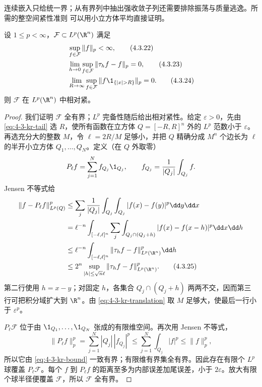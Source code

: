 连续嵌入只给统一界；从有界列中抽出强收敛子列还需要排除振荡与质量逃逸。所需的整空间紧性准则
可以用小立方体平均直接证明。

\begin{lemma}\label{lemma:4-3-3-kolmogorov-riesz}
设 $1\leq p<\infty$，$\mathcal F\subset L^p(\R^n)$ 满足
\begin{align*}
 &\sup_{f\in\mathcal F}\|f\|_p<\infty,\tag{4.3.22}\label{eq:4-3-kr-bound}\\
 &\lim_{h\to0}\sup_{f\in\mathcal F}\|\tau_hf-f\|_p=0,\tag{4.3.23}\label{eq:4-3-kr-translation}\\
 &\lim_{R\to\infty}\sup_{f\in\mathcal F}
   \|f\1_{\{|x|>R\}}\|_p=0.\tag{4.3.24}\label{eq:4-3-kr-tail}
\end{align*}
则 $\mathcal F$ 在 $L^p(\R^n)$ 中相对紧。
\end{lemma}

\begin{proof}
我们证明 $\mathcal F$ 全有界；$L^p$ 完备性随后给出相对紧性。给定 $\varepsilon>0$，先由
\eqref{eq:4-3-kr-tail} 选 $R$，使所有函数在立方体
$Q=[-R,R]^n$ 外的 $L^p$ 范数小于 $\varepsilon$。再选充分大的整数 $M$，令
$\ell=2R/M$ 足够小，并把 $Q$ 精确分成 $M^n$ 个边长为 $\ell$ 的半开小立方体
$Q_1,\ldots,Q_N$。定义（在 $Q$ 外取零）
\[
 P_\ell f=\sum_{j=1}^N f_{Q_j}\1_{Q_j},\qquad
 f_{Q_j}=\frac1{|Q_j|}\int_{Q_j}f.
\]
Jensen 不等式给
\begin{align*}
 \|f-P_\ell f\|_{L^p(Q)}^p
 &\leq\sum_j\frac1{|Q_j|}
   \int_{Q_j}\int_{Q_j}|f(x)-f(y)|^p\dd y\dd x\\
 &=\ell^{-n}\int_{[-\ell,\ell]^n}
   \sum_j\int_{Q_j\cap(Q_j+h)}
   |f(x)-f(x-h)|^p\dd x\dd h\\
 &\leq\ell^{-n}\int_{[-\ell,\ell]^n}
   \|\tau_hf-f\|_{L^p(\R^n)}^p\dd h\\
 &\leq2^n\sup_{|h|\leq\sqrt n\ell}
   \|\tau_hf-f\|_{L^p(\R^n)}^p.
 \tag{4.3.25}\label{eq:4-3-cube-average-approx}
\end{align*}
第二行使用 $h=x-y$；对固定 $h$，各集合 $Q_j\cap(Q_j+h)$ 两两不交，因而第三行可把积分域扩大到
$\R^n$。由 \eqref{eq:4-3-kr-translation} 取 $M$ 足够大，使最后一行小于
$\varepsilon^p$。

$P_\ell\mathcal F$ 位于由 $\1_{Q_1},\ldots,\1_{Q_N}$ 张成的有限维空间。再次用 Jensen
不等式，
\[
 \|P_\ell f\|_p^p
 =\sum_{j=1}^N |Q_j|\,|f_{Q_j}|^p
 \leq\sum_{j=1}^N\int_{Q_j}|f|^p
 \leq\|f\|_p^p,
\]
所以它由 \eqref{eq:4-3-kr-bound} 一致有界；有限维有界集全有界。因此存在有限个 $L^p$ 球覆盖
$P_\ell\mathcal F$。每个 $f$ 到 $P_\ell f$ 的距离至多为内部误差加尾误差，小于
$2\varepsilon$。放大有限个球半径便覆盖 $\mathcal F$，所以 $\mathcal F$ 全有界。
\end{proof}

